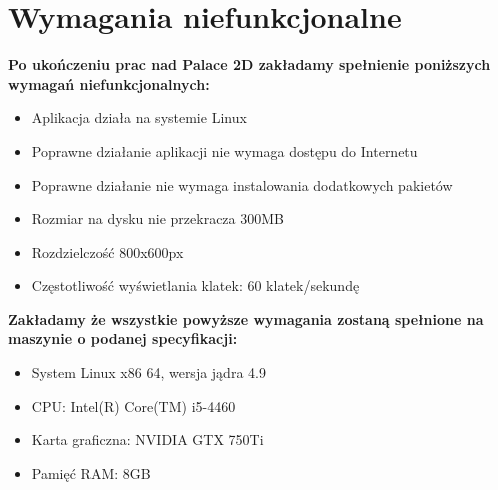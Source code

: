 \documentclass{article}
\begin{document}
\section{Wymagania niefunkcjonalne}

\textbf{Po ukończeniu prac nad Palace 2D zakładamy spełnienie poniższych 
wymagań niefunkcjonalnych:}
  \begin{itemize}
  \item Aplikacja działa na systemie Linux
  \item Poprawne działanie aplikacji nie wymaga dostępu do Internetu
  \item Poprawne działanie nie wymaga instalowania dodatkowych pakietów
  \item Rozmiar na dysku nie przekracza 300MB
  \item Rozdzielczość 800x600px
  \item Częstotliwość wyświetlania klatek: 60 klatek/sekundę
  \end{itemize}


\textbf{\newline Zakładamy że wszystkie powyższe wymagania zostaną
spełnione na maszynie o podanej specyfikacji:}
\begin{itemize}
  \item System Linux x86 64, wersja jądra 4.9
  \item CPU: Intel(R) Core(TM) i5-4460
  \item Karta graficzna: NVIDIA GTX 750Ti
  \item Pamięć RAM: 8GB
\end{itemize}
\end{document}
